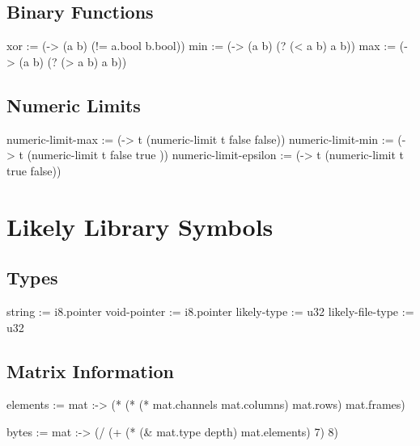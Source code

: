 \documentclass[twoside=false, numbers=noenddot]{scrbook}
\newenvironment{likely}
{ \verbatim }
{ \endverbatim }
\begin{document}
\section{Binary Functions}
\begin{likely}
xor := (-> (a b) (!= a.bool b.bool))
min := (-> (a b) (? (< a b) a b))
max := (-> (a b) (? (> a b) a b))
\end{likely}

\section{Numeric Limits}
\begin{likely}
numeric-limit-max     := (-> t (numeric-limit t false false))
numeric-limit-min     := (-> t (numeric-limit t false true ))
numeric-limit-epsilon := (-> t (numeric-limit t true  false))
\end{likely}

\chapter{Likely Library Symbols}
\section{Types}
\begin{likely}
string       := i8.pointer
void-pointer := i8.pointer
likely-type      := u32
likely-file-type := u32
\end{likely}

\section{Matrix Information}
\begin{likely}
elements :=
  mat :->
    (* (* (* mat.channels mat.columns) mat.rows) mat.frames)

bytes :=
  mat :->
    (/ (+ (* (& mat.type depth) mat.elements) 7) 8)
\end{likely}
\end{document}
